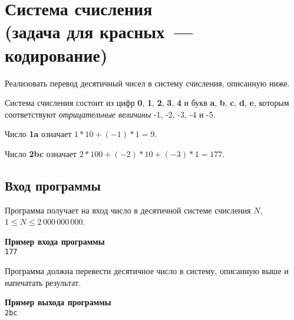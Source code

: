 \documentclass[a4paper,10pt]{article}
\begin{document}
\section*{Система счисления\\
(задача для красных~--- кодирование)}

Реализовать перевод десятичный чисел в систему счисления, описанную ниже.

Система счисления состоит из цифр \textbf{0}, \textbf{1}, \textbf{2}, \textbf{3}, \textbf{4} и букв \textbf{a}, \textbf{b}, \textbf{c}, \textbf{d}, \textbf{e}, которым соответствуют \textit{отрицательные величины} -1, -2, -3, -4 и -5.

Число \textbf{1a} означает $1 * 10 + (-1) * 1 = 9$.

Число \textbf{2bc} означает $2 * 100 + (-2) * 10 + (-3) * 1 = 177$. 

\subsection*{Вход программы}

Программа получает на вход число в десятичной системе счисления $N$, $1 \leq N \leq 2\,000\,000\,000$.

\noindent\textbf{Пример входа программы}\\
\texttt{177}

Программа должна перевести десятичное число в систему, описанную выше и напечатать результат.

\noindent\textbf{Пример выхода программы}\\
\texttt{2bc}
\end{document}
